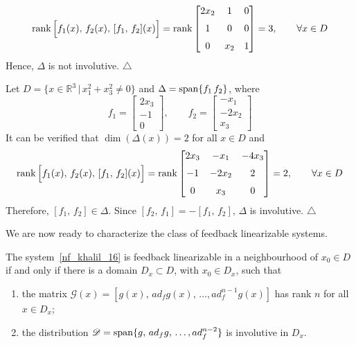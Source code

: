 \documentclass[12pt,a4paper,oneside]{book}
\begin{document}
\begin{onehalfspace}
\begin{example}
	\begin{equation*}
		\rank\Big[f_1(x),\,f_2(x),\,[f_1,\,f_2](x)\Big]=\rank\begin{bmatrix} 2x_2 & 1 & 0 \\[6pt] 1 & 0 & 0 \\[6pt] 0 & x_2 & 1	\end{bmatrix}=3,\qquad\forall x\in D
	\end{equation*}
Hence, $\Delta$ is not involutive.
	\hfill$\triangle$
\end{example}
\begin{example}
	Let $D=\{x\in\mathbb{R}^3\,|\,x_1^2+x_3^2\ne0\}$ and $\Delta=\operatorname{span}\{f_1\,f_2\}$, where
	\begin{equation*}
		f_1=\begin{bmatrix} 2x_3 \\[6pt] -1 \\[6pt] 0 \end{bmatrix},\qquad
		f_2=\begin{bmatrix} -x_1 \\[6pt] -2x_2 \\[6pt] x_3 \end{bmatrix}
	\end{equation*}
	It can be verified that $\dim(\Delta(x))=2$ for all $x\in D$ and
	\begin{equation*}
		\rank\Big[f_1(x),\,f_2(x),\,[f_1,\,f_2](x)\Big]=\rank\begin{bmatrix} 2x_3 & -x_1 & -4x_3 \\[6pt] -1 & -2x_2 & 2 \\[6pt] 0 & x_3 & 0	\end{bmatrix}=2,\qquad\forall x\in D
	\end{equation*}
Therefore, $[f_1,\,f_2]\in\Delta$. Since $[f_2,\,f_1]=-[f_1,\,f_2]$, $\Delta$ is involutive.
		\hfill$\triangle$
\end{example}
We are now ready to characterize the class of feedback linearizable systems.
\begin{thm}\label{involutive_thm}
	The system~\eqref{nf_khalil_16} is feedback linearizable in a neighbourhood of $x_0\in D$ if and only if there is a domain $D_x\subset D$, with $x_0\in D_x$, such that
	\begin{enumerate}
		\item the matrix $\mathscr{G}(x)=[g(x),\,ad_fg(x),\,\dots,ad_f^{n-1}g(x)]$ has rank $n$ for all $x\in D_x$;
		\item the distribution $\mathscr{D}=\operatorname{span}\{g,\,ad_fg,\,\dots,ad_f^{n-2}\}$ is involutive in $D_x$.
	\end{enumerate}
	

\end{thm}
\end{onehalfspace}
\end{document}
